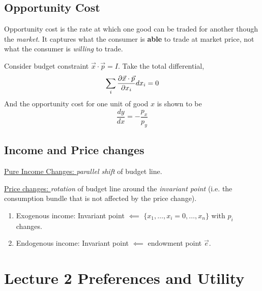 \documentclass[]{article}
\begin{document}
        \subsection{Opportunity Cost}
            \par Opportunity cost is the rate at which one good can be traded for another though the \emph{market}. It captures what the consumer is \textbf{able} to trade at market price, not what the consumer is \emph{willing} to trade.
            \par Consider budget constraint $\vec{x}\cdot\vec{p}=I$. Take the total differential,
            \[
                \sum_i \frac{\partial{\vec{x}\cdot\vec{p}}}{\partial{x_i}} d{x_i} = 0
            \]
            And the opportunity cost for one unit of good $x$ is shown to be 
            \[
                \frac{dy}{dx} = -\frac{p_x}{p_y}
            \]
            
        \subsection{Income and Price changes}
        \par \ul{Pure Income Changes: } \emph{parallel shift} of budget line.
        \par \ul{Price changes: } \emph{rotation} of budget line around the \emph{invariant point} (i.e. the consumption bundle that is not affected by the price change).
            \begin{enumerate}
                \item Exogenous income: Invariant point $\impliedby$ $\{x_1, \dots, x_i=0, \dots, x_n\}$ with $p_i$ changes. 
                \item Endogenous income: Invariant point $\impliedby$ endowment point $\vec{e}$.
            \end{enumerate}
            
    \section{Lecture 2 Preferences and Utility}
\end{document}
